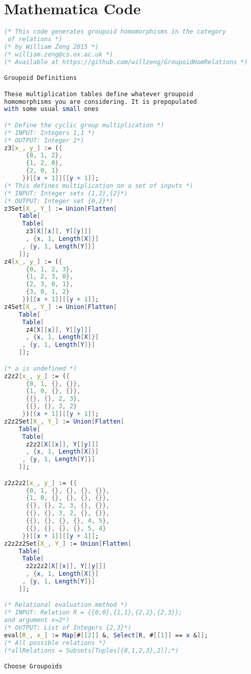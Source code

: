 \section{Mathematica Code}
\begin{lstlisting}[language=Mathematica]
(* This code generates groupoid homomorphisms in the category
 of relations *)
(* by William Zeng 2015 *)
(* william.zeng@cs.ox.ac.uk *)
(* Available at https://github.com/willzeng/GroupoidHomRelations *)

Groupoid Definitions

These multiplication tables define whatever groupoid 
homomorphisms you are considering. It is prepopulated
with some usual small ones

(* Define the cyclic group multiplication *)
(* INPUT: Integers 1,1 *)
(* OUTPUT: Integer 2*)
z3[x_, y_] := ({
      {0, 1, 2},
      {1, 2, 0},
      {2, 0, 1}
     })[[x + 1]][[y + 1]];
(* This defines multiplication on a set of inputs *)
(* INPUT: Integer sets {1,2},{2}*)
(* OUTPUT: Integer set {0,2}*)
z3Set[X_, Y_] := Union[Flatten[
    Table[
     Table[
      z3[X[[x]], Y[[y]]]
      , {x, 1, Length[X]}]
     , {y, 1, Length[Y]}]
    ]];
z4[x_, y_] := ({
      {0, 1, 2, 3},
      {1, 2, 3, 0},
      {2, 3, 0, 1},
      {3, 0, 1, 2}
     })[[x + 1]][[y + 1]];
z4Set[X_, Y_] := Union[Flatten[
    Table[
     Table[
      z4[X[[x]], Y[[y]]]
      , {x, 1, Length[X]}]
     , {y, 1, Length[Y]}]
    ]];

(* a is undefined *)
z2z2[x_, y_] := ({
      {0, 1, {}, {}},
      {1, 0, {}, {}},
      {{}, {}, 2, 3},
      {{}, {}, 3, 2}
     })[[x + 1]][[y + 1]];
z2z2Set[X_, Y_] := Union[Flatten[
    Table[
     Table[
      z2z2[X[[x]], Y[[y]]]
      , {x, 1, Length[X]}]
     , {y, 1, Length[Y]}]
    ]];

z2z2z2[x_, y_] := ({
      {0, 1, {}, {}, {}, {}},
      {1, 0, {}, {}, {}, {}},
      {{}, {}, 2, 3, {}, {}},
      {{}, {}, 3, 2, {}, {}},
      {{}, {}, {}, {}, 4, 5},
      {{}, {}, {}, {}, 5, 4}
     })[[x + 1]][[y + 1]];
z2z2z2Set[X_, Y_] := Union[Flatten[
    Table[
     Table[
      z2z2z2[X[[x]], Y[[y]]]
      , {x, 1, Length[X]}]
     , {y, 1, Length[Y]}]
    ]];

(* Relational evaluation method *)
(* INPUT: Relation R = {{0,0},{1,1},{2,2},{2,3}}; 
and argument x=2*)
(* OUTPUT: List of Integers {2,3}*)
eval[R_, x_] := Map[#[[2]] &, Select[R, #[[1]] == x &]];
(* All possible relations *)
(*allRelations = Subsets[Tuples[{0,1,2,3},2]];*)

Choose Groupoids


\end{lstlisting}
